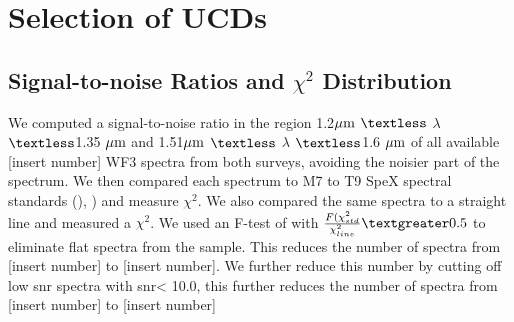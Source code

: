 \documentclass[manuscript]{aastex}
\begin{document}
\section{Selection of UCDs }

\subsection{Signal-to-noise Ratios and $ \chi^ 2$  Distribution}
We computed a signal-to-noise ratio in the region 1.2$\mbox{$\mu$m}$ $\textless$ $\lambda$ $\textless$1.35 $\mbox{$\mu$m}$ and 1.51$\mbox{$\mu$m}$ $\textless$ $\lambda$ $\textless$1.6 $\mbox{$\mu$m}$  of all available [insert number] WF3 spectra from both surveys, avoiding the noisier part of the spectrum.
We then compared each spectrum to M7 to T9 SpeX spectral standards (\citealt{2005ARA&A..43..195K}), \citealt{2006ApJ...637.1067B}) and measure $\chi^2$. 
We also compared the same spectra to a straight line and measured a $\chi^2$. We used an F-test of with $\frac{F(\chi^2_{std}} {\chi^2_{line}} \textgreater 0.5$ to eliminate flat spectra from the sample. This reduces the number of spectra from [insert number] to [insert number]. We further reduce this number by cutting off low snr spectra with snr< 10.0, this further reduces the number of spectra from [insert number] to [insert number]
\end{document}
